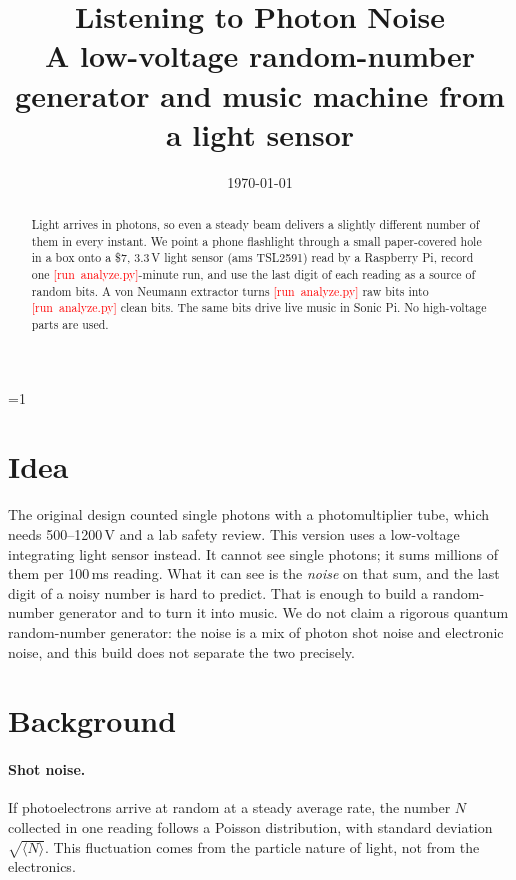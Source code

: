 \documentclass[11pt]{article}
\title{\textbf{Listening to Photon Noise}\\[4pt]
\large A low-voltage random-number generator and music machine from a light sensor}
\author{\authorNames}
\date{\today}
\newcommand{\pending}{\mbox{\textcolor{red}{[run analyze.py]}}}
\newcommand{\isSimulated}{0}
\newcommand{\runMinutes}{\pending}\newcommand{\runMean}{\pending}\newcommand{\runMeanIR}{\pending}
\newcommand{\runRawBits}{\pending}\newcommand{\runBits}{\pending}\newcommand{\runBytes}{\pending}
\begin{document}
\maketitle

\ifnum\isSimulated=1
\noindent{}
\medskip
\fi

\begin{abstract}
\noindent Light arrives in photons, so even a steady beam delivers a slightly different number of them
in every instant. We point a phone flashlight through a small paper-covered hole in a box onto a \$7, 3.3\,V light sensor
(ams TSL2591) read by a Raspberry Pi, record one \runMinutes-minute run, and use the last digit of each
reading as a source of random bits. A von Neumann extractor turns \runRawBits{} raw bits into \runBits{}
clean bits. \runVerdict{} The same bits drive live music in Sonic Pi. No high-voltage parts are used.
\end{abstract}

\section{Idea}
The original design counted single photons with a photomultiplier tube, which needs 500--1200\,V and a lab
safety review. This version uses a low-voltage integrating light sensor instead. It cannot see single
photons; it sums millions of them per 100\,ms reading. What it can see is the \emph{noise} on that sum,
and the last digit of a noisy number is hard to predict. That is enough to build a random-number
generator and to turn it into music. We do not claim a rigorous quantum random-number generator: the
noise is a mix of photon shot noise and electronic noise, and this build does not separate the two
precisely.

\section{Background}
\paragraph{Shot noise.} If photoelectrons arrive at random at a steady average rate, the number $N$
collected in one reading follows a Poisson distribution, with standard deviation $\sqrt{\langle N\rangle}$.
This fluctuation comes from the particle nature of light, not from the electronics.
\end{document}
